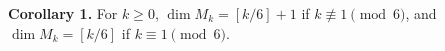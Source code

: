 \textbf{Corollary 1.} For $k \geq 0$, $\dim M_k = [k/6] + 1$ if $k \not\equiv 1 \pmod{6}$, and $\dim M_k = [k/6]$ if $k \equiv 1 \pmod{6}$.
